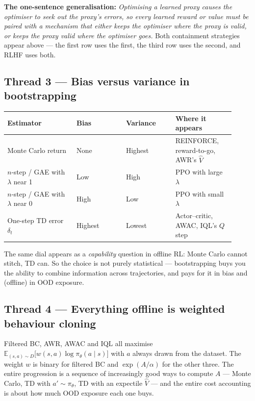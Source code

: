 \documentclass[11pt,a4paper]{article}
\begin{document}
\noindent\textbf{The one-sentence generalisation:} \emph{Optimising a learned
proxy causes the optimiser to seek out the proxy's errors, so every learned
reward or value must be paired with a mechanism that either keeps the
optimiser where the proxy is valid, or keeps the proxy valid where the
optimiser goes.} Both containment strategies appear above --- the first row
uses the first, the third row uses the second, and RLHF uses both.

\subsection{Thread 3 --- Bias versus variance in bootstrapping}

\begin{center}
\begin{tabular}{@{}p{0.28\linewidth}p{0.20\linewidth}p{0.20\linewidth}p{0.24\linewidth}@{}}
\toprule
\textbf{Estimator} & \textbf{Bias} & \textbf{Variance} & \textbf{Where it appears} \\
\midrule
Monte Carlo return & None & Highest & REINFORCE, reward-to-go, AWR's $\hat V$ \\
$n$-step / GAE with $\lambda$ near 1 & Low & High & PPO with large $\lambda$ \\
$n$-step / GAE with $\lambda$ near 0 & High & Low & PPO with small $\lambda$ \\
One-step TD error $\delta_t$ & Highest & Lowest & Actor--critic, AWAC, IQL's $Q$ step \\
\bottomrule
\end{tabular}
\end{center}

\noindent The same dial appears as a \emph{capability} question in offline RL:
Monte Carlo cannot stitch, TD can. So the choice is not purely statistical ---
bootstrapping buys you the ability to combine information across
trajectories, and pays for it in bias and (offline) in OOD exposure.

\subsection{Thread 4 --- Everything offline is weighted behaviour cloning}

Filtered BC, AWR, AWAC and IQL all maximise
$\mathbb E_{(s,a)\sim D}\bigl[w(s,a)\log\pi_\theta(a\mid s)\bigr]$ with
$a$ always drawn from the dataset. The weight $w$ is binary for filtered BC
and $\exp(A/\alpha)$ for the other three. The entire progression is a
sequence of increasingly good ways to compute $A$ --- Monte Carlo, TD with
$a'\sim\pi_\theta$, TD with an expectile $\hat V$ --- and the entire cost
accounting is about how much OOD exposure each one buys.
\end{document}
